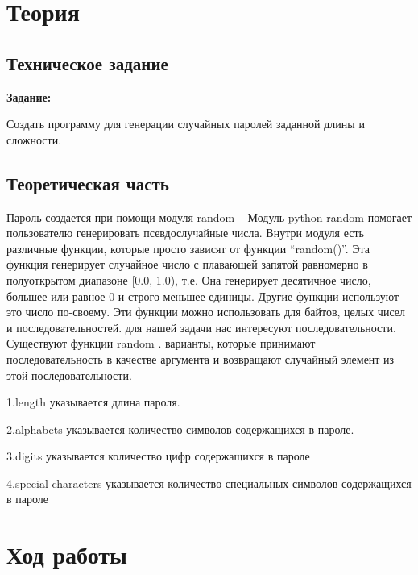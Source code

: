 \documentclass[12pt,a4paper]{scrartcl}
\begin{document}
\begin{enumerate}
\end{enumerate}
\large\tableofcontents

\vspace{25\baselineskip}

\section{Теория}
\subsection{Техническое задание}
\textbf {Задание:}

Создать программу для генерации случайных паролей заданной длины и сложности.

\subsection{Теоретическая часть}

Пароль создается при помощи модуля random – Модуль python random помогает пользователю генерировать псевдослучайные числа. Внутри модуля есть различные функции, которые просто зависят от функции “random()”. Эта функция генерирует случайное число с плавающей запятой равномерно в полуоткрытом диапазоне [0.0, 1.0), т.е. Она генерирует десятичное число, большее или равное 0 и строго меньшее единицы. Другие функции используют это число по-своему. Эти функции можно использовать для байтов, целых чисел и последовательностей. для нашей задачи нас интересуют последовательности. Существуют функции random . варианты, которые принимают последовательность в качестве аргумента и возвращают случайный элемент из этой последовательности.

1.length указывается длина пароля.

2.alphabets указывается количество символов содержащихся в пароле.

3.digits указывается количество цифр содержащихся в пароле

4.special characters  указывается количество специальных символов содержащихся в пароле

\section{Ход работы}
\label{sec:exp}
\end{document}
